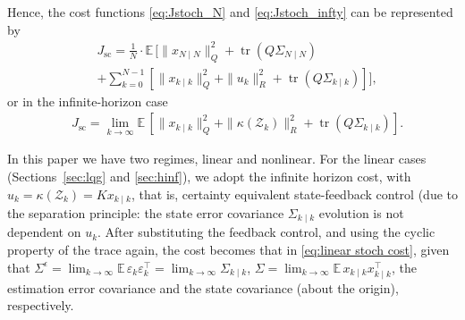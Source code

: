 \documentclass[twocolumn,amsthm]{autart}
\newcommand{\E}{\mathbb{E\,}}
\begin{document}
Hence, the cost functions \eqref{eq:Jstoch_N} and \eqref{eq:Jstoch_infty} can be represented by 
\begin{align*}
     &J_{\mathrm{sc}} = \frac{1}{N} \cdot \E \Bigg [ \| x_{N\mid N} \| ^2_ Q  + \operatorname{tr}(Q \Sigma_{N \mid N})  \nonumber\\
    &+ \sum_{k=0}^{N-1} \left [  \| x_{k\mid k} \|^2_ Q  + \|u_k \|_R^2 + \operatorname{tr}(Q \Sigma_{k \mid k}) \right ] \Bigg ],
\end{align*}
or in the infinite-horizon case
\begin{align*}
     &J_{\mathrm{sc}} = \lim_{k \to \infty} \E  \left [  \| x_{k\mid k} \|^2_ Q  + \|\kappa(\mathcal{Z}_k) \|_R^2 + \operatorname{tr}(Q \Sigma_{k \mid k}) \right ].
\end{align*}

In this paper we have two regimes, linear and nonlinear. For the linear cases (Sections~\ref{sec:lqg} and \ref{sec:hinf}), we adopt the infinite horizon cost, with $u_k = \kappa(\mathcal{Z}_k) = K x_{k \mid k}$, that is, certainty equivalent state-feedback control (due to the separation principle: the state error covariance $\Sigma_{k \mid k}$ evolution is not dependent on $u_k$. After substituting the feedback control, and using the cyclic property of the trace again, the cost becomes that in \eqref{eq:linear stoch cost}, given that $\Sigma^\epsilon = \lim_{k \to \infty} \E \varepsilon_k \varepsilon_k^\top = \lim_{k \to \infty} \Sigma_{k \mid k}$, $\Sigma = \lim _{k \to \infty} \E x_{k \mid k} x_{k \mid k}^\top$, the estimation error covariance and the state covariance (about the origin), respectively.
\end{document}
